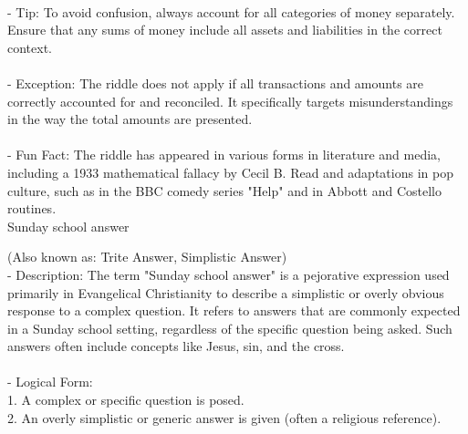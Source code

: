 \documentclass[a4paper,12pt,single,pdftex]{scrartcl}
\begin{document}
    
      
    \\

    
      - Tip: To avoid confusion, always account for all categories of money separately. Ensure that any sums of money include all assets and liabilities in the correct context.
    \\

    
      
    \\

    
      - Exception: The riddle does not apply if all transactions and amounts are correctly accounted for and reconciled. It specifically targets misunderstandings in the way the total amounts are presented.
    \\

    
      
    \\

    
      - Fun Fact: The riddle has appeared in various forms in literature and media, including a 1933 mathematical fallacy by Cecil B. Read and adaptations in pop culture, such as in the BBC comedy series "Help" and in Abbott and Costello routines.
    \\

  

Sunday school answer
    
      (Also known as: Trite Answer, Simplistic Answer)
    \\

  
    
      - Description: The term "Sunday school answer" is a pejorative expression used primarily in Evangelical Christianity to describe a simplistic or overly obvious response to a complex question. It refers to answers that are commonly expected in a Sunday school setting, regardless of the specific question being asked. Such answers often include concepts like Jesus, sin, and the cross.
    \\

    
      
    \\

    
      - Logical Form:
    \\

    
        1. A complex or specific question is posed.
    \\

    
        2. An overly simplistic or generic answer is given (often a religious reference).
    \\
\end{document}
